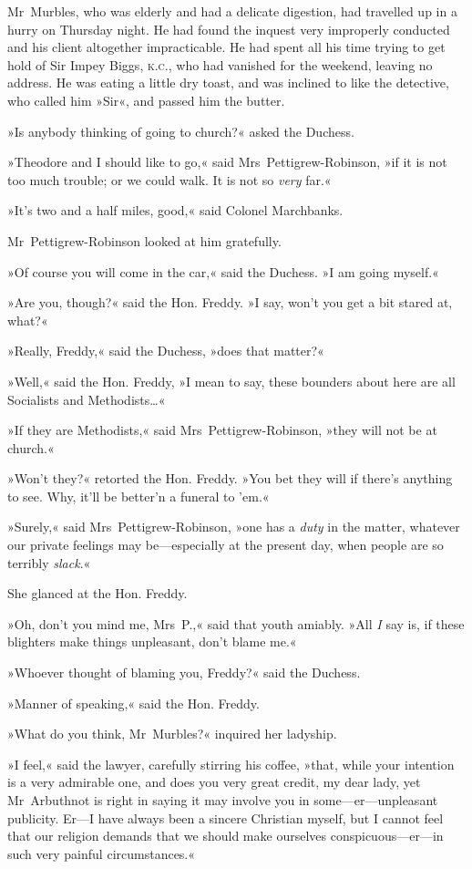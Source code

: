 Mr~Murbles, who was elderly and had a delicate digestion, had travelled up in a hurry on Thursday night. He had found the inquest very improperly conducted and his client altogether impracticable. He had spent all his time trying to get hold of Sir Impey Biggs, \textsc{k.c.}, who had vanished for the weekend, leaving no address. He was eating a little dry toast, and was inclined to like the detective, who called him »Sir«, and passed him the butter.

»Is anybody thinking of going to church?« asked the Duchess.

»Theodore and I should like to go,« said Mrs~Pettigrew-Robinson, »if it is not too much trouble; or we could walk. It is not so \textit{very} far.«

»It's two and a half miles, good,« said Colonel Marchbanks.

Mr~Pettigrew-Robinson looked at him gratefully.

»Of course you will come in the car,« said the Duchess. »I am going myself.«

»Are you, though?« said the Hon. Freddy. »I say, won't you get a bit stared at, what?«

»Really, Freddy,« said the Duchess, »does that matter?«

»Well,« said the Hon. Freddy, »I mean to say, these bounders about here are all Socialists and Methodists\dots«

»If they are Methodists,« said Mrs~Pettigrew-Robinson, »they will not be at church.«

»Won't they?« retorted the Hon. Freddy. »You bet they will if there's anything to see. Why, it'll be better'n a funeral to 'em.«

»Surely,« said Mrs~Pettigrew-Robinson, »one has a \textit{duty} in the matter, whatever our private feelings may be—especially at the present day, when people are so terribly \textit{slack}.«

She glanced at the Hon. Freddy.

»Oh, don't you mind me, Mrs~P.,« said that youth amiably. »All \textit{I} say is, if these blighters make things unpleasant, don't blame me.«

»Whoever thought of blaming you, Freddy?« said the Duchess.

»Manner of speaking,« said the Hon. Freddy.

»What do you think, Mr~Murbles?« inquired her ladyship.

»I feel,« said the lawyer, carefully stirring his coffee, »that, while your intention is a very admirable one, and does you very great credit, my dear lady, yet Mr~Arbuthnot is right in saying it may involve you in some—er—unpleasant publicity. Er—I have always been a sincere Christian myself, but I cannot feel that our religion demands that we should make ourselves conspicuous—er—in such very painful circumstances.«

